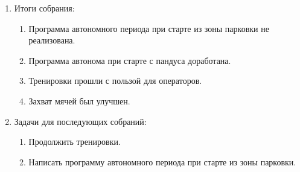 \begin{enumerate}
\begin{enumerate}
	\end{enumerate}
	
	\item Итоги собрания:
	\begin{enumerate}
		
		\item Программа автономного периода при старте из зоны парковки не реализована.
		
		\item Программа автонома при старте с пандуса доработана.
		
        \item Тренировки прошли с пользой для операторов.
        
        \item Захват мячей был улучшен.
		
	\end{enumerate}
	
	\item Задачи для последующих собраний:
	\begin{enumerate}
		
		\item Продолжить тренировки.
		
        \item Написать программу автономного периода при старте из зоны парковки.
        	
	\end{enumerate}
\end{enumerate}
\fillpage
